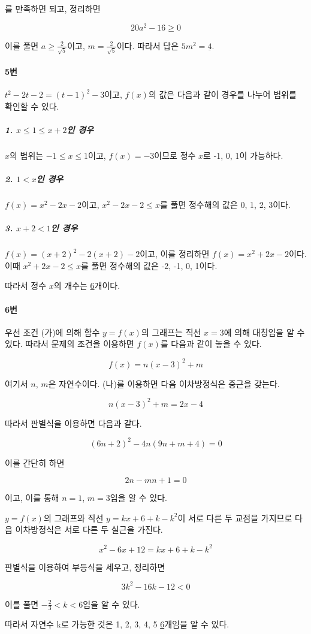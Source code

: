 \documentclass{article}
\begin{document}
를 만족하면 되고, 정리하면

$$
20a^2 - 16 \ge 0
$$

이를 풀면 $a \ge \frac{2}{\sqrt{5}}$이고, $m = \frac{2}{\sqrt{5}}$이다. 따라서 답은 $5m^2 = \underline{4}$.

\paragraph{5번}
$t^2 - 2t - 2 = (t - 1)^2 - 3$이고, $f(x)$의 값은 다음과 같이 경우를 나누어 범위를 확인할 수 있다.

\subparagraph{1. $x \le 1 \le x + 2$인 경우}
$x$의 범위는 $-1 \le x \le 1$이고, $f(x) = -3$이므로 정수 $x$로 -1, 0, 1이 가능하다.

\subparagraph{2. $1 < x$인 경우}
$f(x) = x^2 - 2x - 2$이고, $x^2 - 2x - 2 \le x$를 풀면 정수해의 값은 0, 1, 2, 3이다.

\subparagraph{3. $x + 2 < 1$인 경우}
$f(x) = (x + 2)^2 - 2(x + 2) - 2$이고, 이를 정리하면 $f(x) = x^2 + 2x - 2$이다. 이때 $x^2 + 2x - 2 \le x$를 풀면 정수해의 값은 -2, -1, 0, 1이다. \newline

따라서 정수 $x$의 개수는 \underline{6}개이다.

\paragraph{6번}
우선 조건 (가)에 의해 함수 $y = f(x)$의 그래프는 직선 $x = 3$에 의해 대칭임을 알 수 있다. 따라서 문제의 조건을 이용하면 $f(x)$를 다음과 같이 놓을 수 있다.

$$
f(x) = n(x - 3)^2 + m
$$

여기서 $n$, $m$은 자연수이다. (나)를 이용하면 다음 이차방정식은 중근을 갖는다.

$$
n(x - 3)^2 + m = 2x - 4
$$

따라서 판별식을 이용하면 다음과 같다.

$$
(6n + 2)^2 - 4n(9n + m + 4) = 0
$$

이를 간단히 하면

$$
2n - mn + 1 = 0
$$

이고, 이를 통해 $n = 1$, $m = 3$임을 알 수 있다. \newline

$y = f(x)$의 그래프와 직선 $y = kx + 6 + k - k^2$이 서로 다른 두 교점을 가지므로 다음 이차방정식은 서로 다른 두 실근을 가진다.

$$
x^2 - 6x + 12 = kx + 6 + k - k^2
$$

판별식을 이용하여 부등식을 세우고, 정리하면

$$
3k^2 - 16k - 12 < 0
$$

이를 풀면 $-\frac{2}{3} < k < 6$임을 알 수 있다.

따라서 자연수 k로 가능한 것은 1, 2, 3, 4, 5 \underline{6}개임을 알 수 있다.
\end{document}
